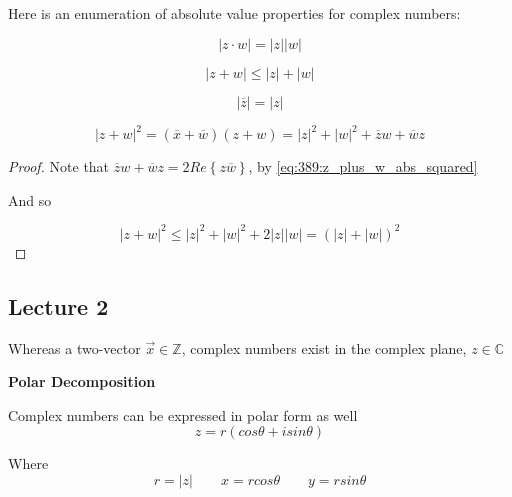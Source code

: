\documentclass[10pt]{article}
\begin{document}
Here is an enumeration of absolute value properties for complex numbers:

\begin{equation}
	| z \cdot  w| = |z| |w|
\end{equation}

\begin{equation}
	|z + w| \le  |z| + |w|
\end{equation}

\begin{equation}
	|\overline{z}| = |z|
\end{equation}

\begin{equation}
	|z + w|^2 = (\overline{x} + \overline{w}) (z + w) = |z|^2 + |w|^2 + \overline{z}w + \overline{w}z
	\label{eq:389:z_plus_w_abs_squared}
\end{equation}

\begin{proof}

Note that $ \overline{z}w + \overline{w}z = 2 Re \left\{ z \overline{w} \right\}  $, by \eqref{eq:389:z_plus_w_abs_squared}

And so 

\begin{equation}
	|z + w|^2 \le  |z|^2 + |w|^2 + 2 |z| |w| = (|z| + |w|)^2
\end{equation}
	
\end{proof}

\subsection{Lecture 2}

Whereas a two-vector $ \vec{x} \in \mathbb{Z} $, complex numbers exist in the complex plane, $ z \in \mathbb{C} $ 



\begin{theorem}
	\textbf{Polar Decomposition} 

	Complex numbers can be expressed in polar form as well
	\begin{equation}
		z = r(cos \theta + i sin \theta)
		\label{eq:389:complex_polar}
	\end{equation}

	Where
	\begin{equation}
		r = |z| \qquad x = rcos \theta \qquad y = rsin \theta
	\end{equation}
\end{theorem}
\end{document}

